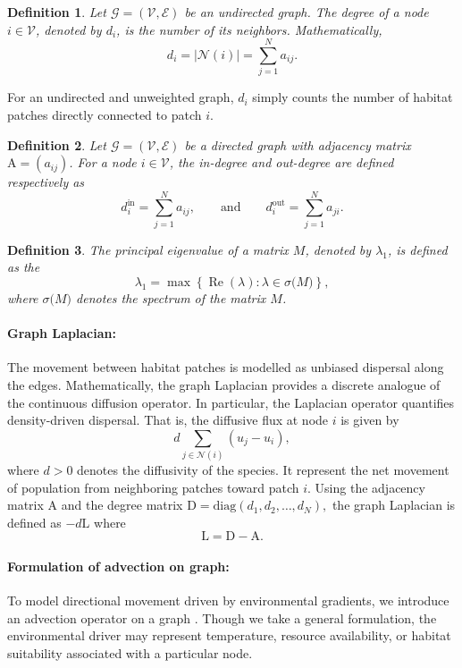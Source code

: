 \documentclass[12pt]{article}
\newtheorem{definition}{Definition}[section]
\begin{document}
\begin{definition}
Let $\mathcal{G} = (\mathcal{V}, \mathcal{E})$ be an undirected graph. 
The \emph{degree} of a node $i \in \mathcal{V}$, denoted by $d_i$, 
is the number of its neighbors. Mathematically,
\[
d_i = |\mathcal{N}(i)| 
= \sum_{j=1}^{N} a_{ij}.
\]
\end{definition}
For an undirected and unweighted graph, $d_i$ simply counts 
the number of habitat patches directly connected to patch $i.$

\begin{definition}
Let $\mathcal{G} = (\mathcal{V}, \mathcal{E})$ be a directed graph 
with adjacency matrix $\mathrm{A} = (a_{ij})$. 
For a node $i \in \mathcal{V}$, the in-degree and 
out-degree are defined respectively as
$$
d_i^{\mathrm{in}} = \sum_{j=1}^{N} a_{ij}, \qquad \text{and}\qquad
d_i^{\mathrm{out}} = \sum_{j=1}^{N} a_{ji}.
$$
\end{definition}

\begin{definition}
The principal eigenvalue of a matrix $M$, denoted by $\lambda_1$, is defined as the
\[
\lambda_1
=
\max \left\{ \operatorname{Re}(\lambda) : \lambda \in \sigma\big(M\big) \right\},
\]
where $\sigma\big(M\big)$ denotes the spectrum of the matrix $M$.
\end{definition}

\paragraph{Graph Laplacian:} The movement between habitat patches is modelled as unbiased dispersal along the edges. Mathematically, the graph Laplacian \cite{hamilton2020graph} provides a discrete analogue of the 
continuous diffusion operator. In particular, the Laplacian operator quantifies density-driven dispersal. That is, the diffusive flux at node $i$ is given by
\begin{equation}
    d \sum_{j \in \mathcal{N}(i)} (u_j - u_i),
\end{equation}
where $d>0$ denotes the diffusivity of the species. It represent the net movement of population from neighboring patches 
toward patch $i.$ Using the adjacency matrix $\mathrm{A}$ and the degree matrix $ \mathrm{D} = \mathrm{diag}(d_1, d_2, \dots, d_N),$ the graph Laplacian is defined as $-d\mathrm{L}$ where
\[
\mathrm{L} = \mathrm{D} - \mathrm{A}.
\] 


\paragraph{Formulation of advection on graph:} To model directional movement driven by environmental gradients, 
we introduce an advection operator on a graph \cite{chapman2015advection,eliasof2024feature}. Though we take a general formulation, the environmental driver may represent temperature, 
resource availability, or habitat suitability associated with a particular node. 
\end{document}
